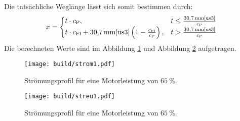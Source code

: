 Die tatsächliche Weglänge lässt sich somit bestimmen durch:
\begin{equation}
	\label{weglänge}
	x =
	\begin{cases}
		t\cdot c_\text{P}, & t \le \frac{\SI{30.7}{\milli\meter}\text{\cite{us3}}}{c_\text{P}} \\
		t\cdot c_\text{Fl} + \SI{30.7}{\milli\meter}\text{\cite{us3}}\left(1-\frac{c_\text{Fl}}{c_\text{P}}\right), & t > \frac{\SI{30.7}{\milli\meter}\text{\cite{us3}}}{c_\text{P}}
	\end{cases}
\end{equation}
Die berechneten Werte sind im Abbildung \ref{ström1fig} und Abbildung \ref{streu1fig} aufgetragen.
\begin{figure}[H]
  \centering
  \texttt{[image: build/strom1.pdf]}
  \caption{Strömungsprofil für eine Motorleistung von $\SI{65}{\percent}$.}
  \label{ström1fig}
\end{figure}
\begin{figure}[H]
  \centering
  \texttt{[image: build/streu1.pdf]}
  \caption{Strömungsprofil für eine Motorleistung von $\SI{65}{\percent}$.}
  \label{streu1fig}
\end{figure}


